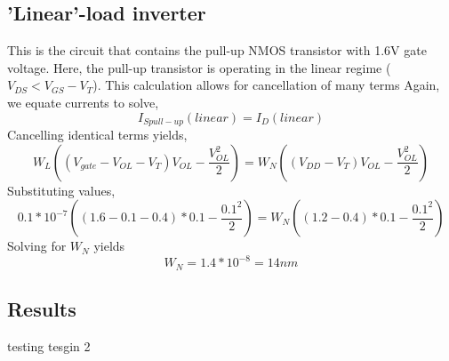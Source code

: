 \documentclass[12pt]{article}
\begin{document}
\subsection*{'Linear'-load inverter}
This is the circuit that contains the pull-up NMOS transistor with 1.6V gate voltage. Here, the pull-up transistor
is operating in the linear regime ($V_{DS} < V_{GS} - V_T$). This calculation allows for cancellation of many terms
Again, we equate currents to solve,
\[ I_{S pull-up}(linear) = I_{D}(linear)\]
Cancelling identical terms yields,
\[W_L ((V_{gate} - V_{OL} - V_T) V_{OL} - \frac{V_{OL}^2}{2}) = W_N ((V_{DD} - V_T) V_{OL} - \frac{V_{OL}^2}{2}) \]
Substituting values,
\[0.1*10^{-7} ((1.6 - 0.1 - 0.4)*0.1 - \frac{0.1^2}{2}) = W_N ((1.2 - 0.4)*0.1 - \frac{0.1^2}{2}) \]
Solving for $W_N$ yields 
\[ W_N = 1.4*10^{-8} = 14nm\]

\subsection{Results}
testing tesgin 2
\pagebreak
\end{document}
